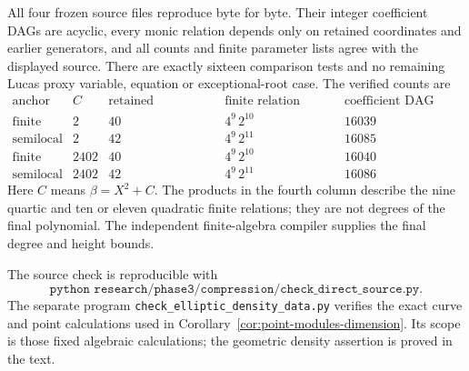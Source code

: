 All four frozen source files reproduce byte for byte.  Their integer
coefficient DAGs are acyclic, every monic relation depends only on
retained coordinates and earlier generators, and all counts and finite
parameter lists agree with the displayed source.  There are exactly
sixteen comparison tests and no remaining Lucas proxy variable,
equation or exceptional-root case.  The verified counts are
\[
\begin{array}{c|c|c|c|c}
\text{anchor}&C&\text{retained coordinates}&
   \text{finite relation degrees}&\text{coefficient DAG nodes}\\\hline
\text{finite}&2&40&4^9\,2^{10}&16039\\
\text{semilocal}&2&42&4^9\,2^{11}&16085\\
\text{finite}&2402&40&4^9\,2^{10}&16040\\
\text{semilocal}&2402&42&4^9\,2^{11}&16086
\end{array}
\]
Here $C$ means $\beta=X^2+C$.  The products in the fourth column
describe the nine quartic and ten or eleven quadratic finite relations;
they are not degrees of the final polynomial.  The independent
finite-algebra compiler supplies the final degree and height bounds.

The source check is reproducible with
\[
 \texttt{python research/phase3/compression/check\_direct\_source.py}.
\]
The separate program \texttt{check\_elliptic\_density\_data.py}
verifies the exact curve and point calculations used in
Corollary~\ref{cor:point-modules-dimension}.  Its scope is those
fixed algebraic calculations; the geometric density assertion is
proved in the text.
